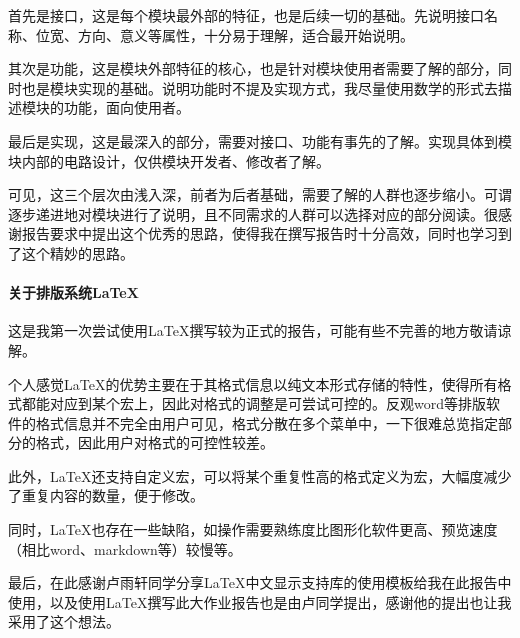 \documentclass[main.tex]{subfiles}
\begin{document}
首先是接口，这是每个模块最外部的特征，也是后续一切的基础。先说明接口名称、位宽、方向、意义等属性，十分易于理解，适合最开始说明。

其次是功能，这是模块外部特征的核心，也是针对模块使用者需要了解的部分，同时也是模块实现的基础。说明功能时不提及实现方式，我尽量使用数学的形式去描述模块的功能，面向使用者。

最后是实现，这是最深入的部分，需要对接口、功能有事先的了解。实现具体到模块内部的电路设计，仅供模块开发者、修改者了解。

可见，这三个层次由浅入深，前者为后者基础，需要了解的人群也逐步缩小。可谓逐步递进地对模块进行了说明，且不同需求的人群可以选择对应的部分阅读。很感谢报告要求中提出这个优秀的思路，使得我在撰写报告时十分高效，同时也学习到了这个精妙的思路。

\paragraph{关于排版系统\LaTeX}
这是我第一次尝试使用\LaTeX 撰写较为正式的报告，可能有些不完善的地方敬请谅解。

个人感觉\LaTeX 的优势主要在于其格式信息以纯文本形式存储的特性，使得所有格式都能对应到某个宏上，因此对格式的调整是可尝试可控的。反观word等排版软件的格式信息并不完全由用户可见，格式分散在多个菜单中，一下很难总览指定部分的格式，因此用户对格式的可控性较差。

此外，\LaTeX 还支持自定义宏，可以将某个重复性高的格式定义为宏，大幅度减少了重复内容的数量，便于修改。

同时，\LaTeX 也存在一些缺陷，如操作需要熟练度比图形化软件更高、预览速度（相比word、markdown等）较慢等。

最后，在此感谢卢雨轩同学分享\LaTeX 中文显示支持库的使用模板给我在此报告中使用，以及使用\LaTeX 撰写此大作业报告也是由卢同学提出，感谢他的提出也让我采用了这个想法。
\end{document}
